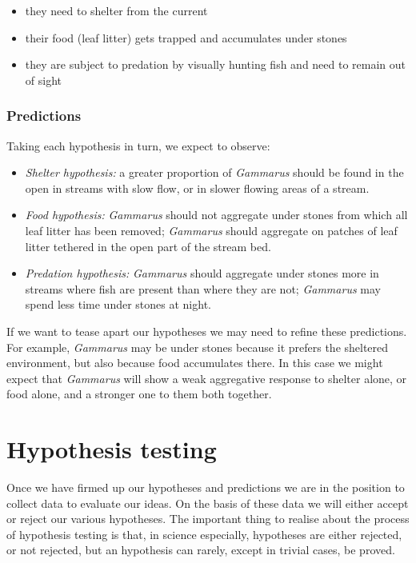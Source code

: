 \documentclass[
]{book}
\begin{document}
\begin{itemize}
\item
  they need to shelter from the current
\item
  their food (leaf litter) gets trapped and accumulates under stones
\item
  they are subject to predation by visually hunting fish and need to remain out of sight
\end{itemize}

\hypertarget{predictions}{%
\subsubsection*{Predictions}\label{predictions}}

Taking each hypothesis in turn, we expect to observe:

\begin{itemize}
\item
  \emph{Shelter hypothesis:} a greater proportion of \emph{Gammarus} should be found in the open in streams with slow flow, or in slower flowing areas of a stream.
\item
  \emph{Food hypothesis:} \emph{Gammarus} should not aggregate under stones from which all leaf litter has been removed; \emph{Gammarus} should aggregate on patches of leaf litter tethered in the open part of the stream bed.
\item
  \emph{Predation hypothesis:} \emph{Gammarus} should aggregate under stones more in streams where fish are present than where they are not; \emph{Gammarus} may spend less time under stones at night.
\end{itemize}

If we want to tease apart our hypotheses we may need to refine these predictions. For example, \emph{Gammarus} may be under stones because it prefers the sheltered environment, but also because food accumulates there. In this case we might expect that \emph{Gammarus} will show a weak aggregative response to shelter alone, or food alone, and a stronger one to them both together.

\hypertarget{hypothesis-testing}{%
\section{Hypothesis testing}\label{hypothesis-testing}}

Once we have firmed up our hypotheses and predictions we are in the position to collect data to evaluate our ideas. On the basis of these data we will either accept or reject our various hypotheses. The important thing to realise about the process of hypothesis testing is that, in science especially, hypotheses are either rejected, or not rejected, but an hypothesis can rarely, except in trivial cases, be proved.
\end{document}
